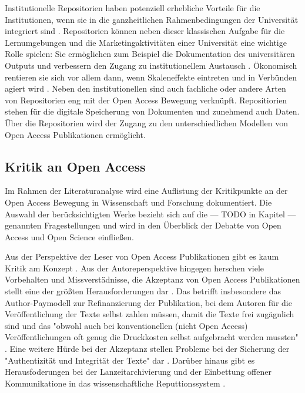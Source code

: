 Institutionelle Repositorien haben potenziell erhebliche Vorteile für die Institutionen, wenn sie in die ganzheitlichen Rahmenbedingungen der Universität integriert sind \cite{steele_2006}. Repositorien können neben dieser klassischen Aufgabe für die Lernumgebungen und die Marketingaktivitäten einer Universität eine wichtige Rolle spielen: Sie ermöglichen zum Beispiel die Dokumentation des universitären Outputs und verbessern den Zugang zu institutionellem Austausch \cite{steele_2006}. Ökonomisch rentieren sie sich vor allem dann, wenn Skaleneffekte eintreten und in Verbünden agiert wird \cite{blythe_2005value}. Neben den institutionellen sind auch fachliche oder andere Arten von Repositorien eng mit der Open Access Bewegung verknüpft. Repositiorien stehen  für die digitale Speicherung von Dokumenten und zunehmend auch Daten. Über die Repositorien wird der Zugang zu den unterschiedlichen Modellen von Open Access Publikationen ermöglicht.

\subsection{Kritik an Open Access}

Im Rahmen der Literaturanalyse wird eine Auflistung der Kritikpunkte an der Open Access Bewegung in Wissenschaft und Forschung dokumentiert. Die Auswahl der berücksichtigten Werke bezieht sich auf die --- TODO in Kapitel --- genannten Fragestellungen und wird in den Überblick der Debatte von Open Access und Open Science einfließen.

Aus der Perspektive der Leser von Open Access Publikationen gibt es kaum Kritik am Konzept \cite{weishaupt_2009_goldenOA}. Aus der Autoreperspektive hingegen herschen viele Vorbehalten und Missverstädnisse, die Akzeptanz von Open Access Publikationen stellt eine der größten Herausforderungen dar \cite{weishaupt_2009_goldenOA} \cite{Suber_2002}. Das betrifft insbesondere das Author-Paymodell zur Refinanzierung der Publikation, bei dem Autoren für die Veröffentlichung der Texte selbst zahlen müssen, damit die Texte frei zugägnlich sind \cite{suchen} und das "obwohl auch bei konventionellen (nicht Open Access) Veröffentlichungen oft genug die Druckkosten selbst aufgebracht werden mussten" \cite{weishaupt_2009_goldenOA}. Eine weitere Hürde bei der Akzeptanz stellen Probleme bei der Sicherung der "Authentizität und Integrität der Texte" dar \cite{weishaupt_2009_goldenOA}. Darüber hinaus gibt es Herausfoderungen bei der Lanzeitarchivierung und der Einbettung offener Kommunikatione in das wissenschaftliche Reputtionssystem \cite{weishaupt_2009_goldenOA} \cite{Suber_2002} \cite{Adema_2014_open_access}.

